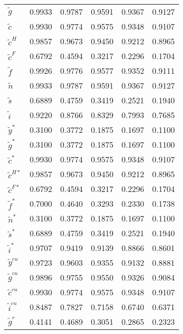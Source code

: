 \begin{center}
\begin{longtable}{lccccc}
${\tilde g}            $	 & 	    0.9933	 & 	    0.9787	 & 	    0.9591	 & 	    0.9367	 & 	    0.9127 \\ 
${\tilde c}            $	 & 	    0.9930	 & 	    0.9774	 & 	    0.9575	 & 	    0.9348	 & 	    0.9107 \\ 
${\tilde c^H}          $	 & 	    0.9857	 & 	    0.9673	 & 	    0.9450	 & 	    0.9212	 & 	    0.8965 \\ 
${\tilde c^F}          $	 & 	    0.6792	 & 	    0.4594	 & 	    0.3217	 & 	    0.2296	 & 	    0.1704 \\ 
${\tilde f}            $	 & 	    0.9926	 & 	    0.9776	 & 	    0.9577	 & 	    0.9352	 & 	    0.9111 \\ 
${\tilde n}            $	 & 	    0.9933	 & 	    0.9787	 & 	    0.9591	 & 	    0.9367	 & 	    0.9127 \\ 
${\tilde s}            $	 & 	    0.6889	 & 	    0.4759	 & 	    0.3419	 & 	    0.2521	 & 	    0.1940 \\ 
${\tilde i}            $	 & 	    0.9220	 & 	    0.8766	 & 	    0.8329	 & 	    0.7993	 & 	    0.7685 \\ 
${\tilde y^*}          $	 & 	    0.3100	 & 	    0.3772	 & 	    0.1875	 & 	    0.1697	 & 	    0.1100 \\ 
${\tilde g^*}          $	 & 	    0.3100	 & 	    0.3772	 & 	    0.1875	 & 	    0.1697	 & 	    0.1100 \\ 
${\tilde c^*}          $	 & 	    0.9930	 & 	    0.9774	 & 	    0.9575	 & 	    0.9348	 & 	    0.9107 \\ 
${\tilde c^{H*}}       $	 & 	    0.9857	 & 	    0.9673	 & 	    0.9450	 & 	    0.9212	 & 	    0.8965 \\ 
${\tilde c^{F*}}       $	 & 	    0.6792	 & 	    0.4594	 & 	    0.3217	 & 	    0.2296	 & 	    0.1704 \\ 
${\tilde f^*}          $	 & 	    0.7000	 & 	    0.4640	 & 	    0.3293	 & 	    0.2330	 & 	    0.1738 \\ 
${\tilde n^*}          $	 & 	    0.3100	 & 	    0.3772	 & 	    0.1875	 & 	    0.1697	 & 	    0.1100 \\ 
${\tilde s^*}          $	 & 	    0.6889	 & 	    0.4759	 & 	    0.3419	 & 	    0.2521	 & 	    0.1940 \\ 
${\tilde i^*}          $	 & 	    0.9707	 & 	    0.9419	 & 	    0.9139	 & 	    0.8866	 & 	    0.8601 \\ 
${\tilde y^{cu}}       $	 & 	    0.9723	 & 	    0.9603	 & 	    0.9355	 & 	    0.9132	 & 	    0.8881 \\ 
${\tilde g^{cu}}       $	 & 	    0.9896	 & 	    0.9755	 & 	    0.9550	 & 	    0.9326	 & 	    0.9084 \\ 
${\tilde c^{cu}}       $	 & 	    0.9930	 & 	    0.9774	 & 	    0.9575	 & 	    0.9348	 & 	    0.9107 \\ 
${\tilde i^{cu}}       $	 & 	    0.8487	 & 	    0.7827	 & 	    0.7158	 & 	    0.6740	 & 	    0.6371 \\ 
${\tilde g^{r}}        $	 & 	    0.4141	 & 	    0.4689	 & 	    0.3051	 & 	    0.2865	 & 	    0.2323 \\ 
\end{longtable}
 \end{center}
